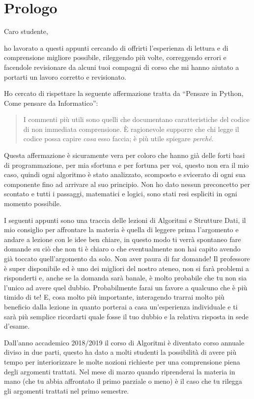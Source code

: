 \chapter*{Prologo}

Caro studente,

ho lavorato a questi appunti cercando di offrirti l'esperienza di lettura e di comprensione migliore possibile, rileggendo più volte, correggendo errori e facendole revisionare da alcuni tuoi compagni di corso che mi hanno aiutato a portarti un lavoro corretto e revisionato.

Ho cercato di rispettare la seguente affermazione tratta da \enquote{Pensare in Python, Come pensare da Informatico}:
\begin{quote}
I commenti più utili sono quelli che documentano caratteristiche del codice di non immediata comprensione.
\`{E} ragionevole supporre che chi legge il codice possa capire \emph{cosa} esso faccia; è più utile spiegare \emph{perché}.
\end{quote}
Questa affermazione è sicuramente vera per coloro che hanno già delle forti basi di programmazione, per mia sfortuna e per fortuna per voi, questo non era il mio caso, quindi ogni algoritmo è stato analizzato, scomposto e svicerato di ogni sua componente fino ad arrivare al suo principio.
Non ho dato nessun preconcetto per scontato e tutti i passaggi, matematici e logici, sono stati resi espliciti in ogni momento possibile.

I seguenti appunti sono una traccia delle lezioni di Algoritmi e Strutture Dati, il mio consiglio per affrontare la materia è quella di leggere prima l'argomento e andare a lezione con le idee ben chiare, in questo modo ti verrà spontaneo fare domande su ciò che non ti è chiaro o che eventualmente non hai capito avendo già toccato quell'argomento da solo.
Non aver paura di far domande! Il professore è super disponibile ed è uno dei migliori del nostro ateneo, non si farà problemi a risponderti e, anche se la domanda sarà banale, è molto probabile che tu non sia l'unico ad avere quel dubbio.
Probabilmente farai un favore a qualcuno che è più timido di te!
E, cosa molto più importante, interagendo trarrai molto più beneficio dalla lezione in quanto porterai a casa un'esperienza individuale e ti sarà più semplice ricordarti quale fosse il tuo dubbio e la relativa risposta in sede d'esame.

Dall'anno accademico 2018/2019 il corso di Algoritmi è diventato corso annuale diviso in due parti, questo ha dato a molti studenti la possibilità di avere più tempo per interiorizzare le molte nozioni richieste per una comprensione piena degli argomenti trattati.
Nel mese di marzo quando riprenderai la materia in mano (che tu abbia affrontato il primo parziale o meno) è il caso che tu rilegga gli argomenti trattati nel primo semestre.

